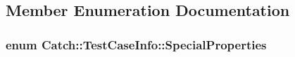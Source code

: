 \subsection{Member Enumeration Documentation}
\subsubsection[{\texorpdfstring{Special\+Properties}{SpecialProperties}}]{\setlength{\rightskip}{0pt plus 5cm}enum {\bf Catch\+::\+Test\+Case\+Info\+::\+Special\+Properties}}\hypertarget{struct_catch_1_1_test_case_info_a39b232f74b4a7a6f2183b96759027eac}{}\label{struct_catch_1_1_test_case_info_a39b232f74b4a7a6f2183b96759027eac}
